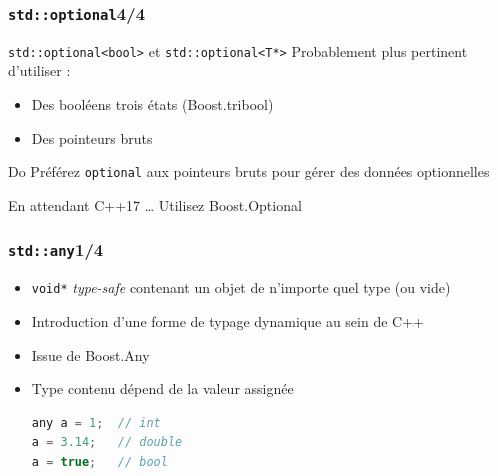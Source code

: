 \documentclass[C++.tex]{subfiles}
\begin{document}
\begin{frame}[fragile]
	\frametitle{\lstinline|std::optional|\titlehfill{}4/4}
	\begin{alertblock}{\lstinline|std::optional<bool>| et \lstinline|std::optional<T*>|}
		Probablement plus pertinent d'utiliser :
		\begin{itemize}
			\item Des booléens \og trois états\fg{} (Boost.tribool)
			\item Des pointeurs bruts
		\end{itemize}
	\end{alertblock}

	\begin{exampleblock}{Do}
		Préférez \lstinline|optional| aux pointeurs bruts pour gérer des données optionnelles

	\end{exampleblock}

	\begin{block}{En attendant C++17 \ldots}
		Utilisez Boost.Optional
	\end{block}
\end{frame}

\begin{frame}[fragile]
	\frametitle{\lstinline|std::any|\titlehfill{}1/4}
	\begin{itemize}
		\item \lstinline|void*| \textit{type-safe} contenant un objet de n'importe quel type (ou vide)
		\item Introduction d'une forme de typage dynamique au sein de C++
		\item Issue de Boost.Any
		\item Type contenu dépend de la valeur assignée

	\begin{lstlisting}[language=C++]
any a = 1;  // int
a = 3.14;   // double
a = true;   // bool\end{lstlisting}
	\end{itemize}
\end{frame}
\end{document}
